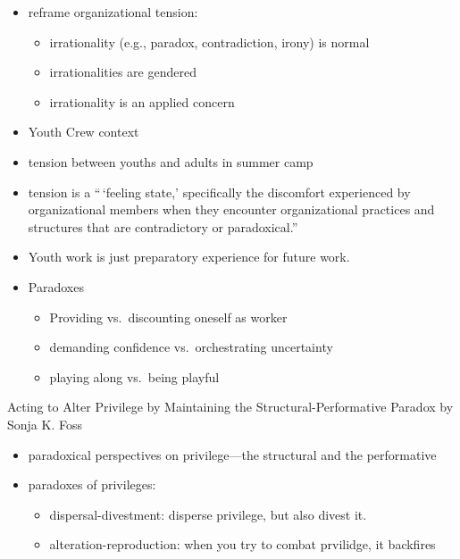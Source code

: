 \documentclass[
]{book}
\begin{document}
\citep{Trethewey_2004}

\begin{itemize}
\item
  reframe organizational tension:

  \begin{itemize}
  \item
    irrationality (e.g., paradox, contradiction, irony) is normal
  \item
    irrationalities are gendered
  \item
    irrationality is an applied concern
  \end{itemize}
\end{itemize}

\citep{Way_2019}

\begin{itemize}
\item
  Youth Crew context
\item
  tension between youths and adults in summer camp
\item
  tension is a ``\,`feeling state,' specifically the discomfort
  experienced by organizational members when they encounter
  organizational practices and structures that are contradictory or
  paradoxical.'' \citep{Putnam_2016}
\item
  Youth work is just preparatory experience for future work.
\item
  Paradoxes

  \begin{itemize}
  \item
    Providing vs.~discounting oneself as worker
  \item
    demanding confidence vs.~orchestrating uncertainty
  \item
    playing along vs.~being playful
  \end{itemize}
\end{itemize}

Acting to Alter Privilege by Maintaining the Structural-Performative
Paradox by Sonja K. Foss

\begin{itemize}
\item
  paradoxical perspectives on privilege---the structural and the
  performative
\item
  paradoxes of privileges:

  \begin{itemize}
  \item
    dispersal-divestment: disperse privilege, but also divest it.
  \item
    alteration-reproduction: when you try to combat prvilidge, it
    backfires
  \end{itemize}
\end{itemize}
\end{document}
